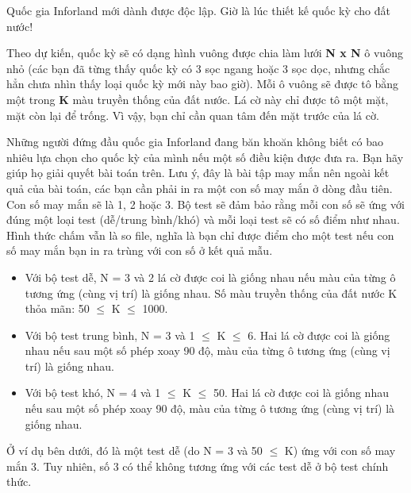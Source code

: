 Quốc gia Inforland mới dành được độc lập. Giờ là lúc thiết kế quốc kỳ cho đất nước!   





   Theo dự kiến, quốc kỳ sẽ có dạng hình vuông được chia làm lưới   \textbf{    N x N   }   ô vuông nhỏ (các bạn đã từng thấy quốc kỳ có 3 sọc ngang hoặc 3 sọc dọc, nhưng chắc hẳn chưa nhìn thấy loại quốc kỳ mới này bao giờ). Mỗi ô vuông sẽ được tô bằng một trong   \textbf{    K   }   màu truyền thống của đất nước. Lá cờ này chỉ được tô một mặt, mặt còn lại để trống. Vì vậy, bạn chỉ cần quan tâm đến mặt trước của lá cờ.  

   Những người đứng đầu quốc gia Inforland đang băn khoăn không biết có bao nhiêu lựa chọn cho quốc kỳ của mình nếu một số điều kiện được đưa ra. Bạn hãy giúp họ giải quyết bài toán trên. Lưu ý, đây là bài tập may mắn nên ngoài kết quả của bài toán, các bạn cần phải in ra một con số may mắn ở dòng đầu tiên. Con số may mắn sẽ là 1, 2 hoặc 3. Bộ test sẽ đảm bảo rằng mỗi con số sẽ ứng với đúng một loại test (dễ/trung bình/khó) và mỗi loại test sẽ có số điểm như nhau. Hình thức chấm vẫn là so file, nghĩa là bạn chỉ được điểm cho một test nếu con số may mắn bạn in ra trùng với con số ở kết quả mẫu.  
\begin{itemize}
	\item     Với bộ test dễ, N = 3 và 2 lá cờ được coi là giống nhau nếu màu của từng ô tương ứng (cùng vị trí) là giống nhau. Số màu truyền thống của đất nước K thỏa mãn: 50  $\le$  K  $\le$  1000.   
\end{itemize}
\begin{itemize}
	\item     Với bộ test trung bình, N = 3 và 1  $\le$  K  $\le$  6. Hai lá cờ được coi là giống nhau nếu sau một số phép xoay 90 độ, màu của từng ô tương ứng (cùng vị trí) là giống nhau.   
\end{itemize}
\begin{itemize}
	\item     Với bộ test khó, N = 4 và 1  $\le$  K  $\le$  50. Hai lá cờ được coi là giống nhau nếu sau một số phép xoay 90 độ, màu của từng ô tương ứng (cùng vị trí) là giống nhau.   
\end{itemize}

   Ở ví dụ bên dưới, đó là một test dễ (do N = 3 và 50  $\le$  K) ứng với con số may mắn 3. Tuy nhiên, số 3 có thể không tương ứng với các test dễ ở bộ test chính thức.